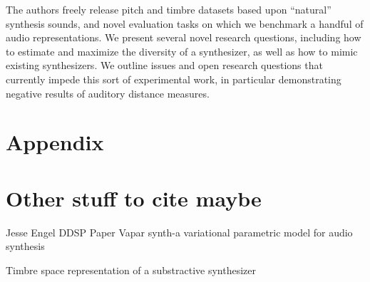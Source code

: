 The authors freely release pitch and timbre datasets based upon ``natural'' synthesis sounds, and novel evaluation tasks on which we benchmark a handful of audio representations. We present several novel research questions, including how to estimate and maximize the diversity of a synthesizer, as well as how to mimic existing synthesizers. We outline issues and open research questions that currently impede this sort of experimental work, in particular demonstrating negative results of auditory distance measures.

%
%

\iffalse
\section{Appendix}

\section{Other stuff to cite maybe}








Jesse Engel DDSP Paper \cite{engel2020ddsp}
Vapar synth-a variational parametric model for audio synthesis \cite{subramani2020vapar}

Timbre space representation of a substractive synthesizer \cite{vahidi2020timbre}

